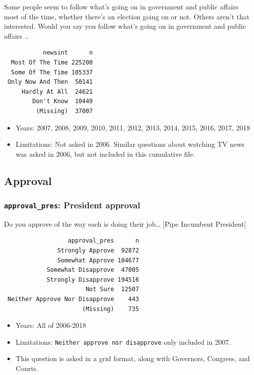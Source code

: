 \documentclass[10pt,article,oneside]{memoir}
\theoremstyle{definition}
\begin{document}
Some people seem to follow what's going on in government and public
affairs most of the time, whether there's an election going on or not.
Others aren't that interested. Would you say you follow what's going on
in government and public affairs ..

\begin{verbatim}
           newsint      n
  Most Of The Time 225200
  Some Of The Time 105337
 Only Now And Then  50141
     Hardly At All  24621
        Don't Know  10449
         (Missing)  37007
\end{verbatim}

\begin{itemize}
\tightlist
\item
  Years: 2007, 2008, 2009, 2010, 2011, 2012, 2013, 2014, 2015, 2016,
  2017, 2018
\item
  Limitations: Not asked in 2006. Similar questions about watching TV
  news was asked in 2006, but not included in this cumulative file.
\end{itemize}

\subsection{Approval}\label{approval}

\subsubsection{\texorpdfstring{\texttt{approval\_pres}: President
approval}{approval\_pres: President approval}}\label{approval_pres-president-approval}

Do you approve of the way each is doing their job\ldots{} {[}Pipe
Incumbent President{]}

\begin{verbatim}
                  approval_pres      n
               Strongly Approve  92872
               Somewhat Approve 104677
            Somewhat Disapprove  47005
            Strongly Disapprove 194516
                       Not Sure  12507
 Neither Approve Nor Disapprove    443
                      (Missing)    735
\end{verbatim}

\begin{itemize}
\tightlist
\item
  Years: All of 2006-2018
\item
  Limitations: \texttt{Neither\ approve\ nor\ disapprove} only included
  in 2007.
\item
  This question is asked in a grid format, along with Governors,
  Congress, and Courts.
\end{itemize}
\end{document}
